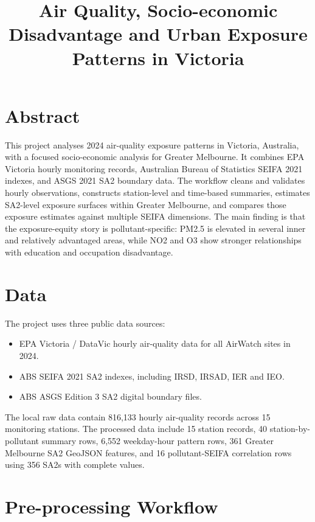 \documentclass[11pt,a4paper]{article}
\title{\textbf{Air Quality, Socio-economic Disadvantage and Urban Exposure Patterns in Victoria}}
\author{}
\date{}
\begin{document}
\maketitle

\section*{Abstract}

This project analyses 2024 air-quality exposure patterns in Victoria, Australia, with a focused socio-economic analysis for Greater Melbourne. It combines EPA Victoria hourly monitoring records, Australian Bureau of Statistics SEIFA 2021 indexes, and ASGS 2021 SA2 boundary data. The workflow cleans and validates hourly observations, constructs station-level and time-based summaries, estimates SA2-level exposure surfaces within Greater Melbourne, and compares those exposure estimates against multiple SEIFA dimensions. The main finding is that the exposure-equity story is pollutant-specific: PM2.5 is elevated in several inner and relatively advantaged areas, while NO2 and O3 show stronger relationships with education and occupation disadvantage.

\section{Data}

The project uses three public data sources:

\begin{itemize}[leftmargin=*]
  \item EPA Victoria / DataVic hourly air-quality data for all AirWatch sites in 2024.
  \item ABS SEIFA 2021 SA2 indexes, including IRSD, IRSAD, IER and IEO.
  \item ABS ASGS Edition 3 SA2 digital boundary files.
\end{itemize}

The local raw data contain 816,133 hourly air-quality records across 15 monitoring stations. The processed data include 15 station records, 40 station-by-pollutant summary rows, 6,552 weekday-hour pattern rows, 361 Greater Melbourne SA2 GeoJSON features, and 16 pollutant-SEIFA correlation rows using 356 SA2s with complete values.

\section{Pre-processing Workflow}
\end{document}
